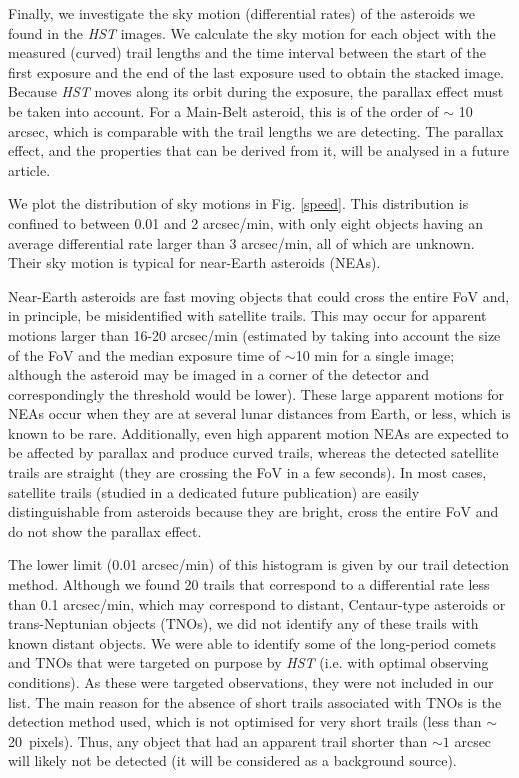 \documentclass{aa}
\begin{document}
Finally, we investigate the sky motion (differential rates) of the asteroids we found in the \textit{HST} images. We calculate the sky motion for each object with the measured (curved) trail lengths and the time interval between the start of the first exposure and the end of the last exposure used to obtain the stacked image. Because \textit{HST} moves along its orbit during the exposure, the parallax effect must be taken into account. For a Main-Belt asteroid, this is of the order of $\sim$ 10 arcsec, which is comparable with the trail lengths we are detecting. The parallax effect, and the properties that can be derived from it, will be analysed in a future article.

We plot the distribution of sky motions in Fig. \ref{speed}. This distribution is confined to between 0.01 and 2 arcsec/min, with only eight objects having an average differential rate larger than 3 arcsec/min, all of which are unknown. Their sky motion is typical for near-Earth asteroids (NEAs).   

Near-Earth asteroids are fast moving objects that could cross the entire FoV and, in principle, be misidentified with satellite trails. This may occur for apparent motions larger than 16-20 arcsec/min (estimated by taking into account the size of the FoV and the median exposure time of $\sim$10 min for a single image; although the asteroid may be imaged in a corner of the detector and correspondingly the threshold would be lower).  These large apparent motions for NEAs occur when they are at several lunar distances from Earth, or less, which is known to be rare. Additionally, even high apparent motion NEAs are expected to be affected by parallax and produce curved trails, whereas the detected satellite trails are straight (they are crossing the FoV in a few seconds). In most cases, satellite trails (studied in a dedicated future publication) are easily distinguishable from asteroids because they are bright, cross the entire FoV and do not show the parallax effect. 

The lower limit (0.01 arcsec/min) of this histogram is given by our trail detection method. Although we found 20 trails that correspond to a differential rate less than 0.1 arcsec/min, which may correspond to distant, Centaur-type asteroids or trans-Neptunian objects (TNOs), we did not identify any of these trails with known distant objects. We were able to identify some of the long-period comets and TNOs that were targeted on purpose by \textit{HST} (i.e. with optimal observing conditions). As these were targeted observations, they were not included in our list.  The main reason for the absence of short trails associated with TNOs is the detection method used, which is not optimised for very short trails (less than $\sim$20\ pixels). Thus, any object that had an apparent trail shorter than $\sim 1$ arcsec will likely not be detected (it will be considered as a background source). 
\end{document}
